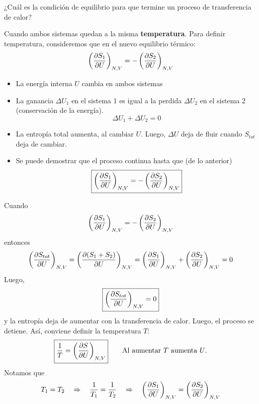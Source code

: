 ¿Cuál es la condición de equilibrio para que termine un proceso de transferencia de calor?

Cuando ambos sistemas quedan a la misma \textbf{temperatura}. Para definir temperatura, consideremos que en el nuevo equilibrio térmico:
\begin{equation}
  \left(\pdv{S_1}{U}\right)_{N,V}=-\left(\pdv{S_2}{U}\right)_{N,V}
\end{equation}
\begin{itemize}
	\item La energía interna $U$ cambia en ambos sistemas
	\item La ganancia $\Delta U_1$ en el sistema 1 es igual a la perdida $\Delta U_2$ en el sistema 2 (conservación de la energía).
	\begin{equation}
  \Delta U_1+\Delta U_2=0
\end{equation}
\item La entropía total aumenta, al cambiar $U$. Luego, $\Delta U$ deja de fluir cuando $S_{tot}$ deja de cambiar.
\item Se puede demostrar que el proceso continua hasta que (de lo anterior)
\begin{equation}
	\boxed{\left(\pdv{S_1}{U}\right)_{N,V}=-\left(\pdv{S_2}{U}\right)_{N,V}}
\end{equation}
\end{itemize}

Cuando
\begin{equation}
  \left(\pdv{S_1}{U}\right)_{N,V}=-\left(\pdv{S_2}{U}\right)_{N,V}
\end{equation}
entonces
\begin{equation}
  \left(\pdv{S_{tot}}{U}\right)_{N,V}=\left(\pdv{(S_1+S_2)}{U}\right)_{N,V}=\left(\pdv{S_1}{U}\right)_{N,V}+\left(\pdv{S_2}{U}\right)_{N,V}=0
\end{equation}
Luego,
\begin{equation}
\boxed{  \left(\pdv{S_{tot}}{U}\right)_{N,V}=0}
\end{equation}
y la entropía deja de aumentar con la transferencia de calor. Luego, el proceso se detiene. Así, conviene definir la temperatura $T$:
\begin{equation}
  \boxed{\frac{1}{T}=\left(\pdv{S}{U}\right)_{N,V}}\qquad \text{Al aumentar $T$ aumenta $U$.}
\end{equation}
Notamos que
\begin{equation}
  T_1=T_2\quad\Rightarrow\quad \frac{1}{T_1}=\frac{1}{T_2}\quad\Rightarrow \quad\left(\pdv{S_1}{U}\right)_{N,V}=\left(\pdv{S_2}{U}\right)_{N,V}
\end{equation}

